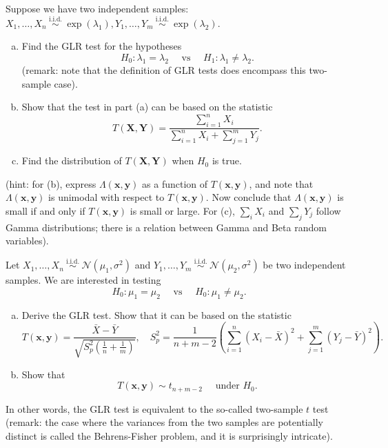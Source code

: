 \begin{ex}
    Suppose we have two independent samples: \(X_{1}, \ldots, X_{n} \stackrel{\text { i.i.d. }}{\sim} \exp \left(\lambda_{1}\right), Y_{1}, \ldots, Y_{m} \stackrel{\text { i.i.d. }}{\sim} \exp \left(\lambda_{2}\right)\). 
    \begin{enumerate}[(a)]
        \item Find the GLR test for the hypotheses
        \[
        H_{0}: \lambda_{1}=\lambda_{2} \quad \text { vs } \quad H_{1}: \lambda_{1} \neq \lambda_{2}. 
        \]
        (remark: note that the definition of GLR tests does encompass this two-sample case). 
        \item Show that the test in part (a) can be based on the statistic
        \[
        T(\mathbf{X}, \mathbf{Y})=\frac{\sum_{i=1}^{n} X_{i}}{\sum_{i=1}^{n} X_{i}+\sum_{j=1}^{m} Y_{j}}. 
        \]
        \item Find the distribution of \(T(\mathbf{X}, \mathbf{Y})\) when \(H_{0}\) is true. 
    \end{enumerate}
    (hint: for (b), express \(\Lambda(\mathbf{x}, \mathbf{y})\) as a function of \(T(\mathbf{x}, \mathbf{y})\), and note that \(\Lambda(\mathbf{x}, \mathbf{y})\) is unimodal with respect to \(T(\mathbf{x}, \mathbf{y})\). Now conclude that \(\Lambda(\mathbf{x}, \mathbf{y})\) is small if and only if \(T(\mathbf{x}, \mathbf{y})\) is small or large. For (c), \(\sum_{i} X_{i}\) and \(\sum_{j} Y_{j}\) follow Gamma distributions; there is a relation between Gamma and Beta random variables).
\end{ex}

\begin{ex}
    Let \(X_{1}, \ldots, X_{n} \stackrel{\text { i.i.d. }}{\sim} \mathcal{N}\left(\mu_{1}, \sigma^{2}\right)\) and \(Y_{1}, \ldots, Y_{m} \stackrel{\text { i.i.d. }}{\sim} \mathcal{N}\left(\mu_{2}, \sigma^{2}\right)\) be two independent samples. We are interested in testing
    \[
        H_{0}: \mu_{1}=\mu_{2} \quad \text { vs } \quad H_{0}: \mu_{1} \neq \mu_{2} .
    \]
    \begin{enumerate}[(a)]
        \item Derive the GLR test. Show that it can be based on the statistic
        \[
            T(\mathbf{x}, \mathbf{y})=\frac{\bar{X}-\bar{Y}}{\sqrt{S_{p}^{2}\left(\frac{1}{n}+\frac{1}{m}\right)}}, \quad S_{p}^{2}=\frac{1}{n+m-2}\left(\sum_{i=1}^{n}\left(X_{i}-\bar{X}\right)^{2}+\sum_{j=1}^{m}\left(Y_{j}-\bar{Y}\right)^{2}\right). 
        \]
        \item Show that
        \[
            T(\mathbf{x}, \mathbf{y}) \sim t_{n+m-2} \quad \text { under } H_{0} .
        \]
    \end{enumerate}
    In other words, the GLR test is equivalent to the so-called two-sample \(t\) test (remark: the case where the variances from the two samples are potentially distinct is called the Behrens-Fisher problem, and it is surprisingly intricate). 
\end{ex}

